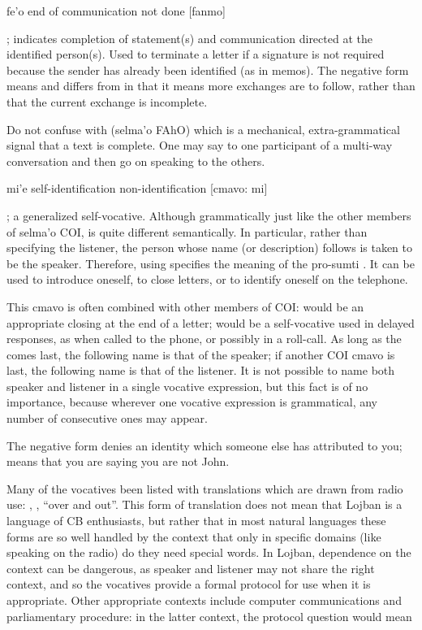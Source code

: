    fe'o    end of communication        not done
            [fanmo]

; indicates completion of statement(s) and
    communication directed at the identified person(s). Used to
    terminate a letter if a signature is not required because the
    sender has already been identified (as in memos). The negative
    form means  and differs from
     in that it means more exchanges are to follow,
    rather than that the current exchange is incomplete. 

Do not confuse  with  (selma'o FAhO) which
    is a mechanical, extra-grammatical signal that a text is
    complete. One may say  to one participant of a
    multi-way conversation and then go on speaking to the
    others.

   mi'e    self-identification     non-identification
        [cmavo: mi]

; a generalized self-vocative. Although
    grammatically just like the other members of selma'o COI,
     is quite different semantically. In particular, rather
    than specifying the listener, the person whose name (or
    description) follows  is taken to be the speaker.
    Therefore, using  specifies the meaning of the
    pro-sumti . It can be used to introduce oneself, to close
    letters, or to identify oneself on the telephone. 

This cmavo is often combined with other members of COI:
     would be an appropriate closing at the end of a
    letter;  would be a self-vocative used in delayed
    responses, as when called to the phone, or possibly in a
    roll-call. As long as the  comes last, the following
    name is that of the speaker; if another COI cmavo is last, the
    following name is that of the listener. It is not possible to
    name both speaker and listener in a single vocative expression,
    but this fact is of no importance, because wherever one
    vocative expression is grammatical, any number of consecutive
    ones may appear.

The negative form denies an identity which someone else has
    attributed to you;  means that you are saying
    you are not John.

Many of the vocatives been listed with translations which
    are drawn from radio use: , , ``over and
    out''. This form of translation does not mean that Lojban is a
    language of CB enthusiasts, but rather that in most natural
    languages these forms are so well handled by the context that
    only in specific domains (like speaking on the radio) do they
    need special words. In Lojban, dependence on the context can be
    dangerous, as speaker and listener may not share the right
    context, and so the vocatives provide a formal protocol for use
    when it is appropriate. Other appropriate contexts include
    computer communications and parliamentary procedure: in the
    latter context, the protocol question  would mean



